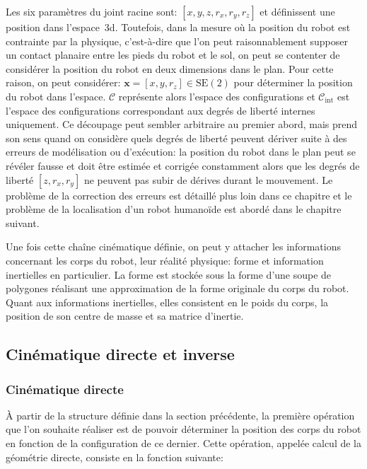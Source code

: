 Les six paramètres du joint racine sont: $[x, y, z, r_x, r_y, r_z]$ et
définissent une position dans l'espace 3d. Toutefois, dans la mesure
où la position du robot est contrainte par la physique, c'est-à-dire
que l'on peut raisonnablement supposer un contact planaire entre les
pieds du robot et le sol, on peut se contenter de considérer la
position du robot en deux dimensions dans le plan. Pour cette raison,
on peut considérer: $\mathbf{x} = [x, y, r_z] \in \text{SE}(2)$ pour
déterminer la position du robot dans l'espace. $\mathcal{C}$
représente alors l'espace des configurations et
$\mathcal{C}_{\text{int}}$ est l'espace des configurations
correspondant aux degrés de liberté internes uniquement. Ce découpage
peut sembler arbitraire au premier abord, mais prend son sens quand on
considère quels degrés de liberté peuvent dériver suite à des erreurs
de modélisation ou d'exécution: la position du robot dans le plan peut
se révéler fausse et doit être estimée et corrigée constamment alors
que les degrés de liberté $[z, r_x, r_y]$ ne peuvent pas subir de
dérives durant le mouvement. Le problème de la correction des erreurs
est détaillé plus loin dans ce chapitre et le problème de la
localisation d'un robot humanoïde est abordé dans le chapitre
suivant.


Une fois cette chaîne cinématique définie, on peut y attacher les
informations concernant les corps du robot, leur réalité physique:
forme et information inertielles en particulier. La forme est stockée
sous la forme d'une soupe de polygones réalisant une approximation de
la forme originale du corps du robot. Quant aux informations
inertielles, elles consistent en le poids du corps, la position de son
centre de masse et sa matrice d'inertie.


\subsection{Cinématique directe et inverse}

\subsubsection{Cinématique directe}

À partir de la structure définie dans la section précédente, la
première opération que l'on souhaite réaliser est de pouvoir
déterminer la position des corps du robot en fonction de la
configuration de ce dernier. Cette opération, appelée calcul de la
géométrie directe, consiste en la fonction suivante:

